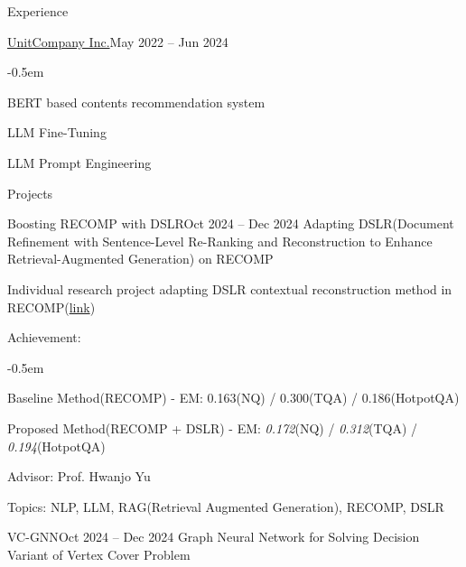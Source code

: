 \documentclass{resume}
\begin{document}
\begin{rSection}{Experience}
\begin{rSubsection}{\href{https://unitcompany.co.kr}{UnitCompany Inc.}}{May 2022 -- Jun 2024}
        \vspace{-0.5em}
        \begin{list}{--}{}
            \itemsep -0.5em

            \item BERT based contents recommendation system

            \item LLM Fine-Tuning

            \item LLM Prompt Engineering
        \end{list}
    \end{rSubsection}
\end{rSection}

\begin{rSection}{Projects}
    \begin{rSubsection}{Boosting RECOMP with DSLR}{Oct 2024 -- Dec 2024}
        Adapting DSLR(Document Refinement with Sentence-Level Re-Ranking and Reconstruction to Enhance Retrieval-Augmented Generation) on RECOMP

        \item Individual research project adapting DSLR contextual reconstruction method in RECOMP(\href{https://github.com/minsusun/boosting-recomp-with-dslr}{link})

        \item Achievement:
        \vspace{-0.5em}
        \begin{list}{--}{\setlength{\rightmargin}{1.5em}}
            \itemsep -0.5em

            \item Baseline Method(RECOMP) - EM: 0.163(NQ) / 0.300(TQA) / 0.186(HotpotQA)

            \item Proposed Method(RECOMP + DSLR) - EM: \emph{0.172}(NQ) / \emph{0.312}(TQA) / \emph{0.194}(HotpotQA)
        \end{list}

        \item Advisor: Prof. Hwanjo Yu

        \item Topics: NLP, LLM, RAG(Retrieval Augmented Generation), RECOMP, DSLR
    \end{rSubsection}

    \begin{rSubsection}{VC-GNN}{Oct 2024 -- Dec 2024}
        Graph Neural Network for Solving Decision Variant of Vertex Cover Problem


\end{rSubsection}
\end{rSection}
\end{document}
